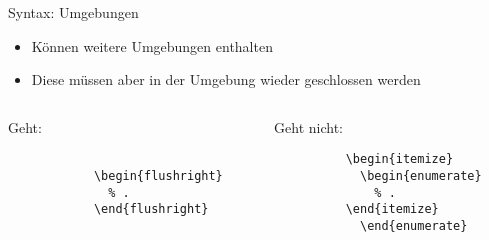 \begin{frame}[fragile]{Syntax: Umgebungen}
  \begin{itemize}
    \item Können weitere Umgebungen enthalten
    \item Diese müssen aber in der Umgebung wieder geschlossen werden
  \end{itemize}
  \begin{columns}[onlytextwidth, t]
    \begin{column}{0.48\textwidth}
      \begin{block}{Geht:}
        \begin{lstlisting}
          
            \begin{flushright}
              % .
            \end{flushright}
          
        \end{lstlisting}
      \end{block}
    \end{column}
    \begin{column}{0.48\textwidth}
      \begin{alertblock}{Geht nicht:}
        \begin{lstlisting}
          \begin{itemize}
            \begin{enumerate}
              % .
          \end{itemize}
            \end{enumerate}
        \end{lstlisting}
      \end{alertblock}
    \end{column}
  \end{columns}
\end{frame}

